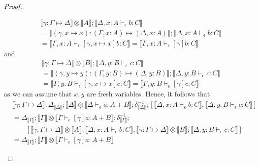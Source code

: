 \documentclass[acmsmall,screen,review]{acmart}
\newcommand{\bhyp}[2]{#1 : #2}
\newcommand{\hasty}[4]{#1 \vdash_{#2} #3: {#4}}
\newcommand{\issubst}[3]{#1: #2 \mapsto #3}
\newcommand{\dnt}[1]{\llbracket{#1}\rrbracket}
\begin{document}
\begin{proof}
\begin{itemize}[leftmargin=*]
\begin{equation}
\begin{aligned}
      & \dnt{\issubst{\gamma}{\Gamma}{\Delta}} \otimes \dnt{A} 
      ; \dnt{\hasty{\Delta, \bhyp{x}{A}}{\epsilon}{b}{C}}
      \\ &= \dnt{\issubst{(\gamma, x \mapsto x)}{(\Gamma, \bhyp{x}{A})}{(\Delta, \bhyp{x}{A})}}
      ; \dnt{\hasty{\Delta, \bhyp{x}{A}}{\epsilon}{b}{C}}
      \\ &= \dnt{\hasty{\Gamma, \bhyp{x}{A}}{\epsilon}{[\gamma, x \mapsto x]b}{C}}
          = \dnt{\hasty{\Gamma, \bhyp{x}{A}}{\epsilon}{[\gamma]b}{C}}
      \end{aligned}
    \end{equation}
    and
    \begin{equation}
      \begin{aligned}
      & \dnt{\issubst{\gamma}{\Gamma}{\Delta}} \otimes \dnt{B} 
      ; \dnt{\hasty{\Delta, \bhyp{y}{B}}{\epsilon}{c}{C}}
      \\ &= \dnt{\issubst{(\gamma, y \mapsto y)}{(\Gamma, \bhyp{y}{B})}{(\Delta, \bhyp{y}{B})}}
      ; \dnt{\hasty{\Delta, \bhyp{y}{B}}{\epsilon}{c}{C}}
      \\ &= \dnt{\hasty{\Gamma, \bhyp{y}{B}}{\epsilon}{[\gamma, x \mapsto x]c}{C}}
          = \dnt{\hasty{\Gamma, \bhyp{y}{B}}{\epsilon}{[\gamma]c}{C}}
      \end{aligned}
    \end{equation}
    as we can assume that $x, y$ are fresh variables. Hence, it follows that
    \begin{equation}
      \begin{aligned}
        & \dnt{\issubst{\gamma}{\Gamma}{\Delta}}
        ; \Delta_{\dnt{\Delta}} 
        ; \dnt{\Delta} \otimes \dnt{\hasty{\Delta}{\epsilon}{a}{A + B}}
        ; \delta^{-1}_{\dnt{\Delta}} 
        ; [
          \dnt{\hasty{\Delta, \bhyp{x}{A}}{\epsilon}{b}{C}}, 
          \dnt{\hasty{\Delta, \bhyp{y}{B}}{\epsilon}{c}{C}}
        ] 
        \\ &
        = \Delta_{\dnt{\Gamma}}
        ; \dnt{\Gamma} \otimes \dnt{\hasty{\Gamma}{\epsilon}{[\gamma]a}{A + B}}
        ; \delta^{-1}_{\dnt{\Gamma}}
        ;  \\ & \qquad
        [
          \dnt{\issubst{\gamma}{\Gamma}{\Delta}} \otimes \dnt{A} 
            ; \dnt{\hasty{\Delta, \bhyp{x}{A}}{\epsilon}{b}{C}}, 
          \dnt{\issubst{\gamma}{\Gamma}{\Delta}} \otimes \dnt{B} 
            ; \dnt{\hasty{\Delta, \bhyp{y}{B}}{\epsilon}{c}{C}}
        ] 
        \\ &
        = \Delta_{\dnt{\Gamma}}
        ; \dnt{\Gamma} \otimes \dnt{\hasty{\Gamma}{\epsilon}{[\gamma]a}{A + B}}

\end{aligned}
\end{equation}
\end{itemize}
\end{proof}
\end{document}
